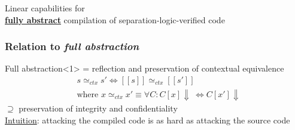 \documentclass{beamer}
\begin{document}


\begin{frame}[plain,c]
\begin{center}
\Huge Linear capabilities for\\  \textbf{\underline{fully abstract}}
compilation of separation-logic-verified code
\end{center}
\end{frame}

\begin{frame}
\frametitle{Relation to \emph{full abstraction}} %
\begin{block}{Full abstraction}<1>
= reflection and preservation of contextual equivalence \\
\vspace{-1em}
\begin{align*}&s\simeq_{ctx}s' \Leftrightarrow [[s]]\simeq_{ctx}[[s']]\\
&\text{where } x\simeq_{ctx}x'\equiv \forall C: C[x]\Downarrow\ \Leftrightarrow C[x']\Downarrow
\end{align*}
$\supseteq$ preservation of integrity and confidentiality \\
\underline{Intuition}: attacking the compiled code is as hard as attacking the source code %
\end{block}
\end{frame}

\end{document}
